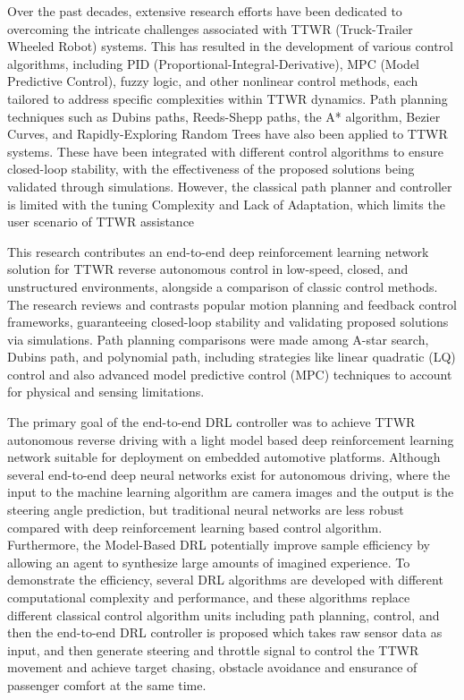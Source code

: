 Over the past decades, extensive research efforts have been dedicated to overcoming the intricate challenges associated with TTWR (Truck-Trailer Wheeled Robot) systems. This has resulted in the development of various control algorithms, including PID (Proportional-Integral-Derivative), MPC (Model Predictive Control), fuzzy logic, and other nonlinear control methods, each tailored to address specific complexities within TTWR dynamics. Path planning techniques such as Dubins paths, Reeds-Shepp paths, the A* algorithm, Bezier Curves, and Rapidly-Exploring Random Trees have also been applied to TTWR systems. These have been integrated with different control algorithms to ensure closed-loop stability, with the effectiveness of the proposed solutions being validated through simulations. However, the classical path planner and controller is limited with the tuning Complexity and Lack of Adaptation, which limits the user scenario of TTWR assistance

This research contributes an end-to-end deep reinforcement learning network solution for TTWR reverse autonomous control in low-speed, closed, and unstructured environments, alongside a comparison of classic control methods. The research reviews and contrasts popular motion planning and feedback control frameworks, guaranteeing closed-loop stability and validating proposed solutions via simulations. Path planning comparisons were made among A-star search, Dubins path, and polynomial path, including strategies like linear quadratic (LQ) control and also advanced model predictive control (MPC) techniques to account for physical and sensing limitations. 

The primary goal of the end-to-end DRL controller was to achieve TTWR autonomous reverse driving with a light model based deep reinforcement learning network suitable for deployment on embedded automotive platforms. Although several end-to-end deep neural networks exist for autonomous driving, where the input to the machine learning algorithm are camera images and the output is the steering angle prediction, but traditional neural networks are less robust compared with deep reinforcement learning based control algorithm. Furthermore, the Model-Based DRL potentially improve sample efficiency by allowing an agent to synthesize large amounts of imagined experience. To demonstrate the efficiency, several DRL algorithms are developed with different computational complexity and performance, and these algorithms replace different classical control algorithm units including path planning, control, and then the end-to-end DRL controller is proposed which takes raw sensor data as input, and then generate steering and throttle signal to control the TTWR movement and achieve target chasing, obstacle avoidance and ensurance of passenger comfort at the same time.
